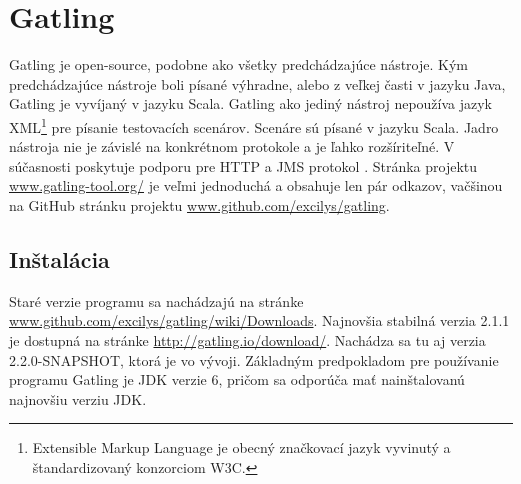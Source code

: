 \documentclass[12pt,oneside,final]{fithesis-utf8}
\begin{document}
\section{Gatling}
Gatling je open-source, podobne ako všetky predchádzajúce nástroje. Kým predchádzajúce nástroje boli písané výhradne, alebo z veľkej časti v jazyku Java, Gatling je vyvíjaný v jazyku Scala. Gatling ako jediný nástroj nepoužíva jazyk XML\footnote{Extensible Markup Language je obecný značkovací jazyk vyvinutý a štandardizovaný konzorciom W3C.} pre písanie testovacích scenárov. Scenáre sú písané v jazyku Scala. Jadro nástroja nie je závislé na konkrétnom protokole a je ľahko rozšíriteľné. V súčasnosti poskytuje podporu pre HTTP a JMS protokol \cite{Gatling}. Stránka projektu \url{www.gatling-tool.org/} je veľmi jednoduchá a obsahuje len pár odkazov, vačšinou na GitHub stránku projektu \url{www.github.com/excilys/gatling}.

\subsection{Inštalácia}
Staré verzie programu sa nachádzajú na stránke \url{www.github.com/excilys/gatling/wiki/Downloads}. Najnovšia stabilná verzia 2.1.1 je dostupná na stránke \url{http://gatling.io/download/}. Nachádza sa tu aj verzia 2.2.0-SNAPSHOT, ktorá je vo vývoji. Základným predpokladom pre používanie programu Gatling je JDK verzie 6, pričom sa odporúča mať nainštalovanú najnovšiu verziu JDK.
\end{document}
